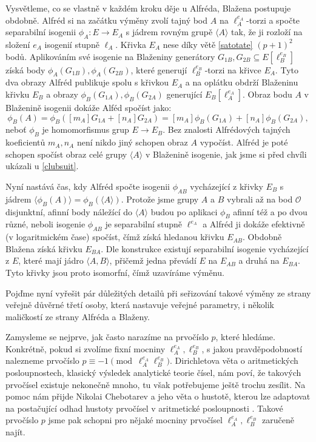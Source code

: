 \documentclass[12pt]{report}
\begin{document}
Vysvětleme, co se vlastně v každém kroku děje u Alfréda, Blažena postupuje obdobně. Alfréd si na začátku výměny zvolí tajný bod $A$ na $\ell_{A}^{e_A}$-torzi a spočte separabilní isogenii $\phi_A : E \longrightarrow E_A$ s jádrem rovným grupě $\langle A \rangle$ tak, že ji rozloží na složení $e_A$ isogenií stupně $\ell_A$. Křivka $E_A$ nese díky větě \ref{satotate} $(p+1)^2$ bodů. Aplikováním své isogenie na Blaženiny generátory $G_{1B},G_{2B} \subseteq E[\ell_B ^{e_B}]$ získá body $\phi_A (G_{1B}), \phi_A (G_{2B})$, které generují $\ell_B ^{e_B}$-torzi na křivce $E_A$. Tyto dva obrazy Alfréd publikuje spolu s křivkou $E_A$ a na oplátku obdrží Blaženinu křivku $E_B$ a obrazy $\phi_B (G_{1A}), \phi_B (G_{2A})$ generující $E_B [\ell_A ^{e_A}]$. Obraz bodu $A$ v Blaženině isogenii dokáže Alféd spočíst jako:
\begin{equation*}
\phi_B (A) = \phi_B ([m_A] G_{1A} + [n_A] G_{2A}) = [m_A] \phi_B (G_{1A}) + [n_A] \phi_B (G_{2A}),
\end{equation*}
{\hypersetup{linkcolor=black}neboť $\phi_B$ je homomorfismus grup $E \longrightarrow E_B$. Bez znalosti Alfrédových tajných koeficientů $m_A,n_A$ není nikdo jiný schopen obraz $A$ vypočíst. Alfréd je poté schopen spočíst obraz celé grupy $\langle A \rangle$ v Blaženině isogenie, jak jsme si před chvíli ukázali u \eqref{clubsuit}.}

Nyní nastává čas, kdy Alfréd spočte isogenii $\phi_{AB}$ vycházející z křivky $E_B$ s jádrem $\langle \phi_B (A) \rangle = \phi_B (\langle A \rangle)$. Protože jsme grupy $A$ a $B$ vybrali až na bod $\mathcal{O}$ disjunktní, afinní body náležící do $\langle A \rangle$ budou po aplikaci $\phi_B$ afinní též a po dvou různé, neboli isogenie $\phi_{AB}$ je separabilní stupně $\ell^{e_A}$ a Alfréd ji dokáže efektivně (v logaritmickém čase) spočíst, čímž získá hledanou křivku $E_{AB}$. Obdobně Blažena získá křivku $E_{BA}$. Dle konstrukce existují separabilní isogenie vycházející z $E$, které mají jádro $\langle A,B \rangle$, přičemž jedna převádí $E$ na $E_{AB}$ a druhá na $E_{BA}$. Tyto křivky jsou proto isomorfní, čímž uzavíráme výměnu.
 
Pojďme nyní vyřešit pár důležitých detailů při seřizování takové výměny ze strany veřejně důvěrné třetí osoby, která nastavuje veřejné parametry, i několik maličkostí ze strany Alfréda a Blaženy.

Zamysleme se nejprve, jak často narazíme na prvočíslo $p$, které hledáme. Konkrétně, pokud si zvolíme fixní mocniny $\ell_A ^{e_A}, \ell_B ^{e_B}$, s jakou pravděpodobností nalezneme  prvočíslo $p \equiv -1 \pmod{\ell_{A}^{e_A} \ell_{B}^{e_B}}$. Dirichletova věta o aritmetických posloupnostech, klasický výsledek analytické teorie čísel, nám poví, že takových prvočísel existuje nekonečně mnoho, tu však potřebujeme ještě trochu zesílit. Na pomoc nám přijde Nikolai Chebotarev a jeho věta o hustotě, kterou lze adaptovat na postačující odhad hustoty prvočísel v aritmetické posloupnosti \cite{Lagarias}. Takové prvočíslo $p$ jsme pak schopni pro nějaké mocniny prvočísel $\ell_A ^{e_A},\ell_B ^{e_B}$ zaručeně najít.
\end{document}
